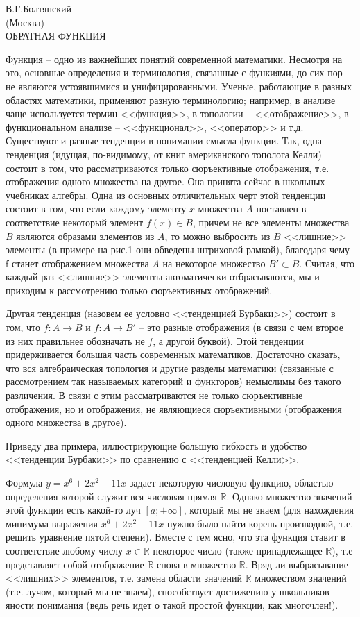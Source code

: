 \documentclass{article}
\begin{document}
\pagestyle{fancy}
В.Г.Болтянский
\\(Москва)
\\ОБРАТНАЯ ФУНКЦИЯ
\par Функция -- одно из важнейших понятий современной математики. Несмотря на это, основные определения и терминология, связанные с функиями, до сих пор не являются устоявшимися и унифицированными. Ученые, работающие в разных областях математики, применяют разную терминологию; например, в анализе чаще используется термин <<функция>>, в топологии -- <<отображение>>, в функциональном анализе -- <<функционал>>, <<оператор>> и т.д. Существуют и разные тенденции в понимании смысла функции. Так, одна тенденция (идущая, по-видимому, от книг американского тополога Келли) состоит в том, что рассматриваются только сюръективные отображения, т.е. отображения одного множества на другое. Она принята сейчас в школьных учебниках алгебры. Одна из основных отличительных черт этой тенденции состоит в том, что если каждому элементу $x$ множества $A$ поставлен в соответствие некоторый элемент $f(x)\in B$, причем не все элементы множества $B$ являются образами элементов из $A$, то можно выбросить из $B$ <<лишние>> элементы (в примере на рис.1 они обведены штриховой рамкой), благодаря чему f станет отображением множества $A$  на некоторое множество $B'\subset B$. Считая, что каждый раз <<лишние>> элементы автоматически отбрасываются, мы и приходим к рассмотрению только сюръективных отображений.
%
%
%
%
%
\par Другая тенденция (назовем ее условно <<тенденцией Бурбаки>>) состоит в том, что $f\colon A\to B$ и $f\colon A \to B'$ -- это разные отображения (в связи с чем второе из них правильнее обозначать не $f$, а другой буквой). Этой тенденции придерживается большая часть современных математиков. Достаточно сказать, что вся алгебраическая топология и другие разделы математики (связанные с рассмотрением так называемых категорий и функторов) немыслимы без такого различения. В связи с этим рассматриваются не только сюръективные отображения, но и отображения, не являющиеся сюръективными (отображения одного множества в другое).
\par Приведу два примера, иллюстрирующие большую гибкость и удобство <<тенденции Бурбаки>> по сравнению с <<тенденцией Келли>>.
\par Формула $y=x^6+2x^2-11x$ задает некоторую числовую функцию, областью определения которой служит вся числовая прямая $\mathbb{R}$. Однако множество значений этой функции есть какой-то луч $[a;+\infty]$, который мы не знаем (для нахождения минимума выражения $x^6+2x^2-11x$ нужно было найти корень производной, т.е. решить уравнение пятой степени). Вместе с тем ясно, что эта функция ставит в соответствие любому числу $x\in \mathbb{R}$ некоторое число (также принадлежащее $\mathbb{R}$), т.е представляет собой отображение $\mathbb{R}$ снова в множество $\mathbb{R}$. Вряд ли выбрасывание <<лишних>> элементов, т.е. замена области значений $\mathbb{R}$ множеством значений (т.е. лучом, который мы не знаем), способствует достижению у школьников яности понимания (ведь речь идет о такой простой функции, как многочлен!).
\end{document}
